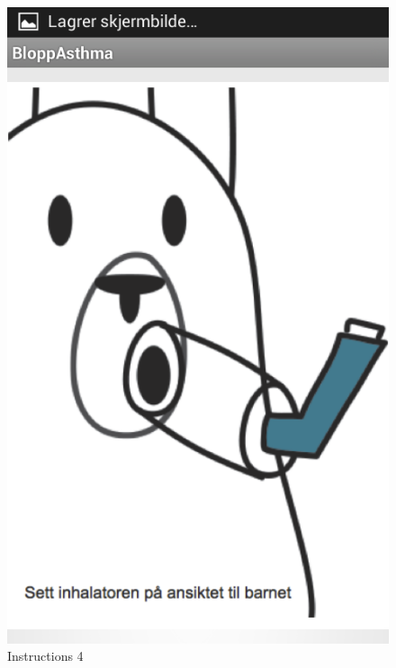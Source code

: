 \begin{figure}[H]
	\begin{minipage}[b]{0.3\linewidth}
		\centering
		\includegraphics[width=0.20\paperwidth]{Pictures/app-screenshots/instructions-4.png}
		\caption{Instructions 4}
		\label{fig:instructions-4}
	\end{minipage}
	\begin{minipage}[b]{0.3\linewidth}
		\centering

\end{minipage}
\end{figure}
